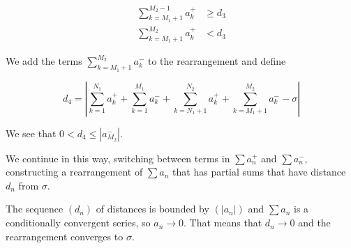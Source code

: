 \begin{solution}
\begin{align*}
\sum_{k = M_1 + 1}^{M_2-1} a^+_k  &\geq d_3 \\
\sum_{k = M_1 + 1}^{M_2} a^+_k & < d_3
\end{align*}

We add the terms $\sum_{k = M_1 + 1}^{M_2} a^-_k$ to the rearrangement and define 

$$
d_4 = |\sum_{k = 1}^{N_1} a^+_k + \sum_{k = 1}^{M_1} a^-_k + \sum_{k = N_1 + 1}^{N_2} a^+_k + \sum_{k = M_1 + 1}^{M_2} a^-_k - \sigma|
$$

We see that $0 < d_4 \leq |a^-_{M_2}|$.

We continue in this way, switching between terms in $\sum a^+_n$ and $\sum a^-_n$, constructing a rearrangement of $\sum a_n$ that has partial sums that have distance $d_n$ from $\sigma$.

The sequence $(d_n)$ of distances is bounded by $(|a_n|)$ and $\sum a_n$ is a conditionally convergent series, so $a_n \to 0$. That means that $d_n \to 0$ and the rearrangement converges to $\sigma$.

\end{solution}
